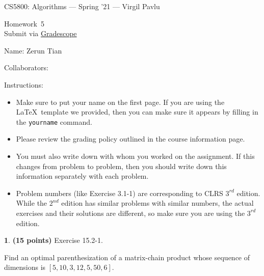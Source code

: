\documentclass[11pt]{article}
\newcommand{\yourname}{Zerun Tian}
\newcommand{\yourcollaborators}{}
\theoremstyle{definition}
\newcommand{\instructor}{Virgil Pavlu}
\newcommand{\hwnum}{5}
\theoremstyle{theorem}
\newtheorem{prob}{}
\newcommand{\solution}{\medskip\noindent{\color{DarkBlue}\textbf{Solution:}}}
\begin{document}
{\Large 
\begin{center}{CS5800: Algorithms} --- Spring '21 --- \instructor \end{center}}
{\large
\vspace{10pt}
\noindent Homework~\hwnum \vspace{2pt}\\
Submit via \href{https://www.gradescope.com/courses/232127}{Gradescope}}

\bigskip
{\large \noindent Name: \yourname }

{\large \noindent Collaborators: \yourcollaborators}

\vspace{15pt}

{\large \noindent Instructions:}

\begin{itemize}

\item Make sure to put your name on the first page.  If you are using the \LaTeX~template we provided, then you can make sure it appears by filling in the \texttt{yourname} command.

\item Please review the grading policy outlined in the course information page.

\item You must also write down with whom you worked on the assignment.  If this changes from problem to problem, then you should write down this information separately with each problem.

\item Problem numbers (like Exercise 3.1-1) are corresponding to CLRS $3^{rd}$ edition.  While the  $2^{nd}$ edition  has  similar  problems  with  similar  numbers,  the  actual  exercises  and their solutions are different, so make sure you are using the $3^{rd}$ edition.

\end{itemize}

\newpage
\begin{prob} \textbf{(15 points)} Exercise 15.2-1.
\end{prob}
Find an optimal parenthesization of a matrix-chain product whose sequence of dimensions is $[5, 10, 3, 12, 5, 50, 6]$.

\solution
\end{document}
